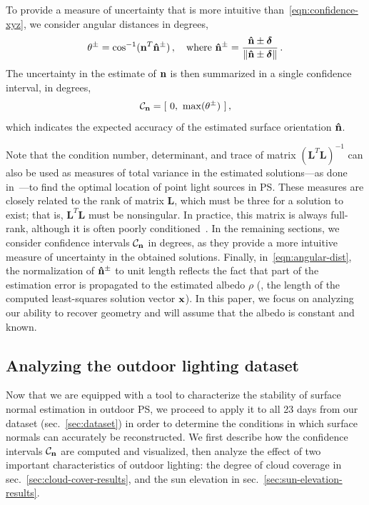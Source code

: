 To provide a measure of uncertainty that is more intuitive than~\eqref{eqn:confidence-xyz}, we consider angular distances in degrees,
%
\begin{equation}
\theta^\pm = \cos^{-1}(\mathbf{n}^T{\bf \hat n}^\pm)\,,
\quad \text{where }
{\bf \hat n}^\pm = \frac{{\bf \hat n} \pm \boldsymbol \delta}{\lVert{\bf \hat n} \pm \boldsymbol \delta \rVert}\,.
\label{eqn:angular-dist}
\end{equation}
%
The uncertainty in the estimate of ${\bf n}$ is then summarized in a single confidence interval, in degrees,
%
\begin{equation}
\mathcal{C}_{\bf n} = [ \ 0, \ \max (\theta^\pm) \ ]\,,
\label{eqn:confidence-degrees}
\end{equation}
which indicates the expected accuracy of the estimated surface orientation ${\bf \hat n}$.

Note that the condition number, determinant, and trace of matrix $(\mathbf{L}^T\mathbf{L})^{-1}$ can also be used as measures of total variance in the estimated solutions---as done in~\cite{sun-ivc-07}---to find the optimal location of point light sources in PS. These measures are closely related to the rank of matrix $\mathbf{L}$, which must be three for a solution to exist; that is, $\mathbf{L}^T\mathbf{L}$ must be nonsingular. In practice, this matrix is always full-rank, although it is often poorly conditioned~\cite{shen-pg-14}. In the remaining sections, we consider confidence intervals $\mathcal{C}_{\bf n}$ in degrees, as they provide a more intuitive measure of uncertainty in the obtained solutions. Finally, in~\eqref{eqn:angular-dist}, the normalization of ${\bf \hat n}^\pm$ to unit length reflects the fact that part of the estimation error is propagated to the estimated albedo $\rho$ (\ie, the length of the computed least-squares solution vector ${\bf x}$). In this paper, we focus on analyzing our ability to recover geometry and will assume that the albedo is constant and known.

\subsection{Analyzing the outdoor lighting dataset}
\label{sec:datasetanalysis}

Now that we are equipped with a tool to characterize the stability of surface normal estimation in outdoor PS, we proceed to apply it to all 23 days from our dataset (sec.~\ref{sec:dataset}) in order to determine the conditions in which surface normals can accurately be reconstructed. We first describe how the confidence intervals $\mathcal{C}_{\bf n}$ are computed and visualized, then analyze the effect of two important characteristics of outdoor lighting: the degree of cloud coverage in sec.~\ref{sec:cloud-cover-results}, and the sun elevation in sec.~\ref{sec:sun-elevation-results}.

